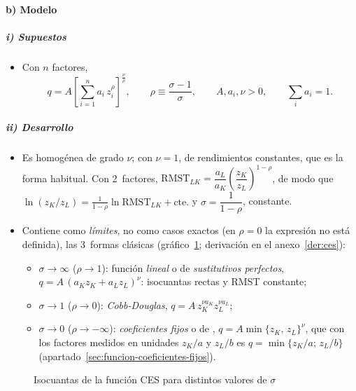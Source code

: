 \documentclass[11pt]{article}
\begin{document}
\paragraph{b) Modelo}

\subparagraph{i) Supuestos}

\begin{itemize}
\item Con $n$ factores,
  \begin{equation}
  q=A\left[\sum_{i=1}^{n}a_i\,z_i^{\rho}\right]^{\frac{\nu}{\rho}},\qquad \rho\equiv\frac{\sigma-1}{\sigma},\qquad A,a_i,\nu>0,\qquad \textstyle\sum_ia_i=1. \label{eq:ces}
  \end{equation}
\end{itemize}

\subparagraph{ii) Desarrollo}

\begin{itemize}
\item Es homogénea de grado $\nu$; con $\nu=1$, de rendimientos constantes, que es la forma habitual. Con 2~factores, $\mathrm{RMST}_{LK}=\dfrac{a_L}{a_K}\left(\dfrac{z_K}{z_L}\right)^{1-\rho}$, de modo que $\ln(z_K/z_L)=\frac{1}{1-\rho}\ln \mathrm{RMST}_{LK}+\text{cte.}$ y $\sigma=\dfrac{1}{1-\rho}$, constante.
\item Contiene como \emph{límites}, no como casos exactos (en $\rho=0$ la expresión no está definida), las 3~formas clásicas (gráfico~\ref{fig:ces-isocuantas}; derivación en el anexo~\ref{der:ces}):
  \begin{itemize}
  \item $\sigma\to\infty$ ($\rho\to 1$): función \emph{lineal} o de \emph{sustitutivos perfectos}, $q=A\,(a_Kz_K+a_Lz_L)^{\nu}$: isocuantas rectas y RMST constante;
  \item $\sigma\to 1$ ($\rho\to 0$): \emph{Cobb-Douglas}, $q=A\,z_K^{\nu a_K}z_L^{\nu a_L}$;
  \item $\sigma\to 0$ ($\rho\to-\infty$): \emph{coeficientes fijos} o de , $q=A\min\{z_K,\,z_L\}^{\nu}$, que con los factores medidos en unidades $z_K/a$ y $z_L/b$ es $q=\min\{z_K/a;\,z_L/b\}$ (apartado~\ref{sec:funcion-coeficientes-fijos}).
  \end{itemize}
\end{itemize}

\begin{figure}[H]
\centering
\caption{Isocuantas de la función CES para distintos valores de $\sigma$}\label{fig:ces-isocuantas}
\end{figure}
\end{document}
